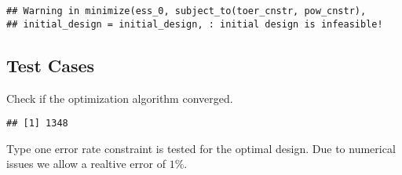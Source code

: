 \documentclass[]{book}
\newenvironment{Shaded}{\begin{snugshade}}{\end{snugshade}}
\newcommand{\DataTypeTok}[1]{\textcolor[rgb]{0.13,0.29,0.53}{#1}}
\newcommand{\DecValTok}[1]{\textcolor[rgb]{0.00,0.00,0.81}{#1}}
\newcommand{\FloatTok}[1]{\textcolor[rgb]{0.00,0.00,0.81}{#1}}
\newcommand{\KeywordTok}[1]{\textcolor[rgb]{0.13,0.29,0.53}{\textbf{#1}}}
\newcommand{\NormalTok}[1]{#1}
\newcommand{\OperatorTok}[1]{\textcolor[rgb]{0.81,0.36,0.00}{\textbf{#1}}}
\newcommand{\StringTok}[1]{\textcolor[rgb]{0.31,0.60,0.02}{#1}}
\begin{document}
\begin{verbatim}
## Warning in minimize(ess_0, subject_to(toer_cnstr, pow_cnstr),
## initial_design = initial_design, : initial design is infeasible!
\end{verbatim}

\hypertarget{test-cases-4}{%
\subsection{Test Cases}\label{test-cases-4}}

Check if the optimization algorithm converged.

\begin{Shaded}
\end{Shaded}

\begin{verbatim}
## [1] 1348
\end{verbatim}

\begin{Shaded}
\end{Shaded}

Type one error rate constraint is tested for the optimal design.
Due to numerical issues we allow a realtive error of \(1\%\).

\begin{Shaded}
\end{Shaded}
\end{document}
